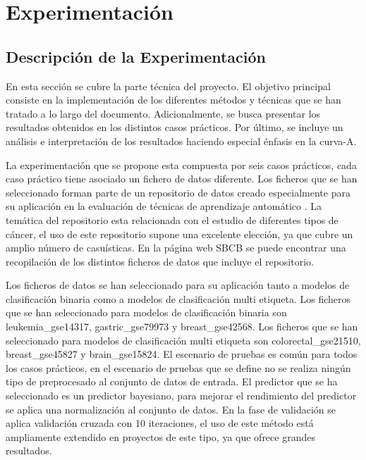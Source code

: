 \section{Experimentación}

\subsection{Descripción de la Experimentación}

En esta sección se cubre la parte técnica del proyecto. El objetivo principal consiste en la implementación de los diferentes métodos y técnicas que se han tratado a lo largo del documento. Adicionalmente, se busca presentar los resultados obtenidos en los distintos casos prácticos. Por último, se incluye un análisis e interpretación de los resultados haciendo especial énfasis en la curva-A.

\bigbreak

La experimentación que se propone esta compuesta por seis casos prácticos, cada caso práctico tiene asociado un fichero de datos diferente. Los ficheros que se han seleccionado forman parte de un repositorio de datos creado especialmente para su aplicación en la evaluación de técnicas de aprendizaje automático \cite{Feltes2019}. La temática del repositorio esta relacionada con el estudio de diferentes tipos de cáncer, el uso de este repositorio supone una excelente elección, ya que cubre un amplio número de casuísticas. En la página web SBCB \cite{SBCB} se puede encontrar una recopilación de los distintos ficheros de datos que incluye el repositorio. 

\bigbreak

Los ficheros de datos se han seleccionado para su aplicación tanto a modelos de clasificación binaria como a modelos de clasificación multi etiqueta. Los ficheros que se han seleccionado para modelos de clasificación binaria son leukemia\_gse14317, gastric\_gse79973 y breast\_gse42568. Los ficheros que se han seleccionado para modelos de clasificación multi etiqueta son colorectal\_gse21510, breast\_gse45827 y brain\_gse15824. El escenario de pruebas es común para todos los casos prácticos, en el escenario de pruebas que se define no se realiza ningún tipo de preprocesado al conjunto de datos de entrada. El predictor que se ha seleccionado es un predictor bayesiano, para mejorar el rendimiento del predictor se aplica una normalización al conjunto de datos. En la fase de validación se aplica validación cruzada con 10 iteraciones, el uso de este método está ampliamente extendido en proyectos de este tipo, ya que ofrece grandes resultados.

